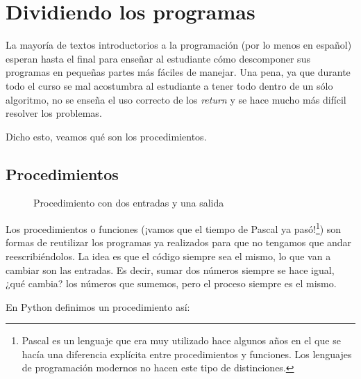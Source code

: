 \chapter{Dividiendo los programas}

La mayoría de textos introductorios a la programación (por lo menos en español) esperan hasta el final para enseñar al estudiante cómo descomponer sus programas en pequeñas partes más fáciles de manejar. Una pena, ya que durante todo el curso se mal acostumbra al estudiante a tener todo dentro de un sólo algoritmo, no se enseña el uso correcto de los \emph{return} y se hace mucho más difícil resolver los problemas.

Dicho esto, veamos qué son los procedimientos.

\section{Procedimientos}

\begin{figure}[h]
\centering
{}
\caption{Procedimiento con dos entradas y una salida}
\label{figproc}
\end{figure}

Los procedimientos o funciones (¡vamos que el tiempo de Pascal ya pasó!\footnote{Pascal es un lenguaje que era muy utilizado hace algunos años en el que se hacía una diferencia explícita entre procedimientos y funciones. Los lenguajes de programación modernos no hacen este tipo de distinciones.}) son formas de reutilizar los programas ya realizados para que no tengamos que andar reescribiéndolos. La idea es que el código siempre sea el mismo, lo que van a cambiar son las entradas. Es decir, sumar dos números siempre se hace igual, ¿qué cambia? los números que sumemos, pero el proceso siempre es el mismo.

En Python definimos un procedimiento así: \\

